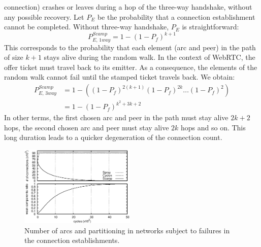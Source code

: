 \begin{asparadesc}
  connection) crashes or leaves during a hop of the three-way
  handshake, without any possible recovery. Let $P_E$ be the
  probability that a connection establishment cannot be
  completed. Without three-way handshake, $P_E$ is straightforward:
  \begin{equation} P_{E,\,1way}^{Scamp}=1-(1-
    P_f)^{k+1} \end{equation} This corresponds to the probability that
  each element (arc and peer) in the path of size $k+1$ stays alive
  during the random walk. In the context of WebRTC, the offer ticket
  must travel back to its emitter. As a consequence, the elements of
  the random walk cannot fail until the stamped ticket travels
  back. We obtain:
  \begin{align} P_{E,\,3way}^{Scamp} &=1 - ((1-P_f)^{2(k+1)} (1-P_f)^{2k}
                                       \ldots (1-P_f)^2) \nonumber \\
                                     &=1-(1-P_f)^{k^2+3k+2}
  \end{align}
  In other terms, the first chosen arc and peer in the path must stay
  alive $2k+2$ hops, the second chosen arc and peer must stay alive
  $2k$ hops and so on.  This long duration leads to a quicker
  degeneration of the connection count.


\end{asparadesc}


\begin{figure}
  \centering \includegraphics[width=0.49\textwidth]{img/degen.eps}
  \caption{\label{fig:degeneration}Number of arcs and partitioning in networks
    subject to failures in the connection establishments.}
\end{figure}


